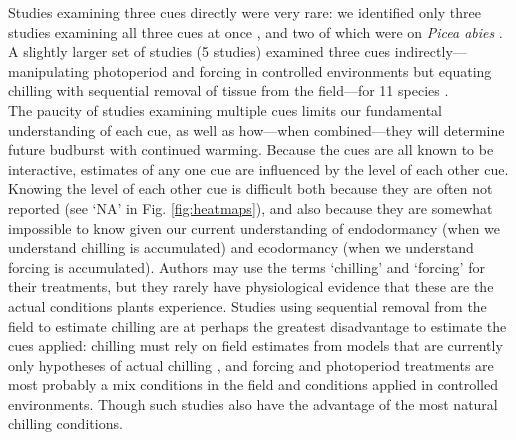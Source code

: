 \documentclass[11pt,letter]{article}
\begin{document}
Studies examining three cues directly were very rare: we identified only three studies examining all three cues at once \citep{Worrall:1967aa,Skuterud:1994aa,Sogaard:2008aa}, and two of which were on \emph{Picea abies} \citep{Worrall:1967aa,Sogaard:2008aa}. A slightly larger set of studies (5 studies) examined three cues indirectly---manipulating photoperiod and forcing in controlled environments but equating chilling with sequential removal of tissue from the field---for 11 species \citep{Schnabel:1987aa,Heide:1993,Partanen:1998aa,Basler:2014aa}. \\

The paucity of studies examining multiple cues limits our fundamental understanding of each cue, as well as how---when combined---they will determine future budburst with continued warming. Because the cues are all known to be interactive, estimates of any one cue are influenced by the level of each other cue. Knowing the level of each other cue is difficult both because they are often not reported (see `NA' in Fig. \ref{fig:heatmaps}), and also because they are somewhat impossible to know given our current understanding of endodormancy (when we understand chilling is accumulated) and ecodormancy (when we understand forcing is accumulated). Authors may use the terms `chilling' and `forcing' for their treatments, but they rarely have physiological evidence that these are the actual conditions plants experience. Studies using sequential removal from the field to estimate chilling are at perhaps the greatest disadvantage to estimate the cues applied: chilling must rely on field estimates from models that are currently only hypotheses of actual chilling \citep{dennis2003}, and forcing and photoperiod treatments are most probably a mix conditions in the field and conditions applied in controlled environments. Though such studies also have the advantage of the most natural chilling conditions. \\%
\end{document}
